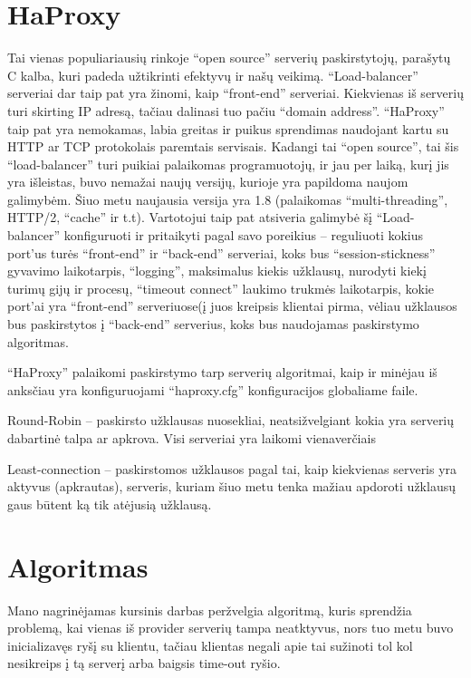 \documentclass{VUMIFPSkursinis}
\begin{document}
\section{HaProxy}
Tai vienas populiariausių rinkoje “open source” serverių paskirstytojų, parašytų C kalba, kuri padeda užtikrinti efektyvų ir našų veikimą. “Load-balancer” serveriai dar taip pat yra žinomi, kaip “front-end” serveriai. Kiekvienas iš serverių turi skirting IP adresą, tačiau dalinasi tuo pačiu “domain address”. “HaProxy” taip pat yra nemokamas, labia greitas ir puikus sprendimas naudojant kartu su HTTP ar TCP protokolais paremtais servisais. Kadangi tai “open source”, tai šis “load-balancer” turi puikiai palaikomas programuotojų, ir jau per laiką, kurį jis yra išleistas, buvo nemažai naujų versijų, kurioje yra papildoma naujom galimybėm. Šiuo metu  naujausia versija yra 1.8 (palaikomas “multi-threading”, HTTP/2, “cache” ir t.t). Vartotojui taip pat atsiveria galimybė šį “Load-balancer” konfiguruoti ir pritaikyti pagal savo poreikius – reguliuoti kokius port’us turės “front-end” ir “back-end” serveriai, koks bus “session-stickness” gyvavimo laikotarpis, “logging”, maksimalus kiekis užklausų, nurodyti kiekį turimų gijų ir procesų, “timeout connect” laukimo trukmės laikotarpis, kokie port’ai yra “front-end” serveriuose(į juos kreipsis klientai pirma, vėliau užklausos bus paskirstytos į “back-end” serverius, koks bus naudojamas paskirstymo algoritmas.

“HaProxy” palaikomi paskirstymo tarp serverių algoritmai, kaip ir minėjau iš anksčiau yra konfiguruojami “haproxy.cfg” konfiguracijos globaliame faile.

Round-Robin – paskirsto užklausas nuosekliai, neatsižvelgiant kokia yra serverių dabartinė talpa ar apkrova. Visi serveriai yra laikomi vienaverčiais

Least-connection – paskirstomos užklausos pagal tai, kaip kiekvienas serveris yra aktyvus (apkrautas), serveris, kuriam šiuo metu tenka mažiau apdoroti užklausų gaus būtent ką tik atėjusią užklausą.

\section{Algoritmas}
Mano nagrinėjamas kursinis darbas peržvelgia algoritmą, kuris sprendžia problemą, kai vienas iš provider serverių tampa neatktyvus, nors tuo metu buvo inicializavęs ryšį su klientu, tačiau klientas negali apie tai sužinoti tol kol nesikreips į tą serverį arba baigsis time-out ryšio. 
\end{document}
